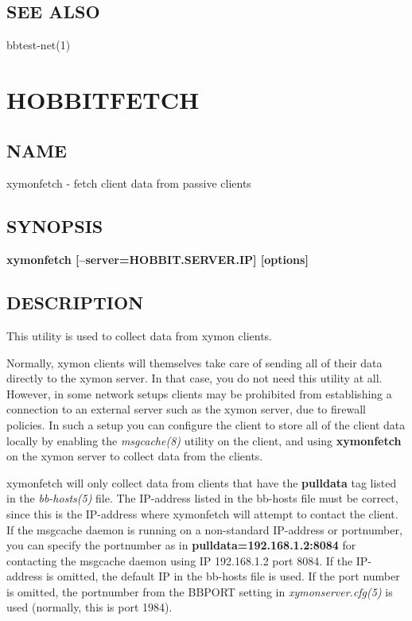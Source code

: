  
\subsection{SEE ALSO}
bbtest-net(1) 
  


%
\newpage
\section{HOBBITFETCH}
\subsection{NAME}
 xymonfetch - fetch client data from passive clients \
\subsection{SYNOPSIS}
\textbf{xymonfetch [--server=HOBBIT.SERVER.IP] [options]}


 
\subsection{DESCRIPTION}
 This utility is used to collect data from xymon clients. 

  Normally, xymon clients will themselves take care of sending all of
  their data directly to the xymon server. In that case, you do not
  need this utility at all. However, in some network setups clients
  may be prohibited from establishing a connection to an external
  server such as the xymon server, due to firewall policies. In such
  a setup you can configure the client to store all of the client data
  locally by enabling the \emph{msgcache(8)} utility on the client,
  and using \textbf{xymonfetch} on the xymon server to collect data
  from the clients. 



  xymonfetch will only collect data from clients that have the
  \textbf{pulldata} tag listed in the \emph{bb-hosts(5)} file. The
  IP-address listed in the bb-hosts file must be correct, since this
  is the IP-address where xymonfetch will attempt to contact the
  client. If the msgcache daemon is running on a non-standard
  IP-address or portnumber, you can specify the portnumber as in
  \textbf{pulldata=192.168.1.2:8084} for contacting the msgcache
  daemon using IP 192.168.1.2 port 8084. If the IP-address is omitted,
  the default IP in the bb-hosts file is used. If the port number is
  omitted, the portnumber from the BBPORT setting in
  \emph{xymonserver.cfg(5)} is used (normally, this is port 1984). 



